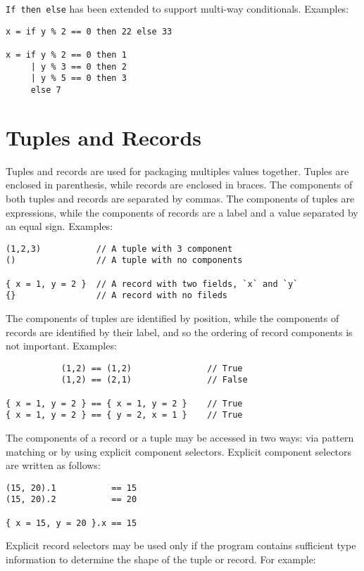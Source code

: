 \texttt{If then else} has been extended to support multi-way
conditionals. Examples:

\begin{verbatim}
x = if y % 2 == 0 then 22 else 33

x = if y % 2 == 0 then 1
     | y % 3 == 0 then 2
     | y % 5 == 0 then 3
     else 7
\end{verbatim}

\section{Tuples and Records}\label{tuples-and-records}

Tuples and records are used for packaging multiples values together.
Tuples are enclosed in parenthesis, while records are enclosed in
braces. The components of both tuples and records are separated by
commas. The components of tuples are expressions, while the components
of records are a label and a value separated by an equal sign. Examples:

\begin{verbatim}
(1,2,3)           // A tuple with 3 component
()                // A tuple with no components

{ x = 1, y = 2 }  // A record with two fields, `x` and `y`
{}                // A record with no fileds
\end{verbatim}

The components of tuples are identified by position, while the
components of records are identified by their label, and so the ordering
of record components is not important. Examples:

\begin{verbatim}
           (1,2) == (1,2)               // True
           (1,2) == (2,1)               // False

{ x = 1, y = 2 } == { x = 1, y = 2 }    // True
{ x = 1, y = 2 } == { y = 2, x = 1 }    // True
\end{verbatim}

The components of a record or a tuple may be accessed in two ways: via
pattern matching or by using explicit component selectors. Explicit
component selectors are written as follows:

\begin{verbatim}
(15, 20).1           == 15
(15, 20).2           == 20

{ x = 15, y = 20 }.x == 15
\end{verbatim}

Explicit record selectors may be used only if the program contains
sufficient type information to determine the shape of the tuple or
record. For example:

